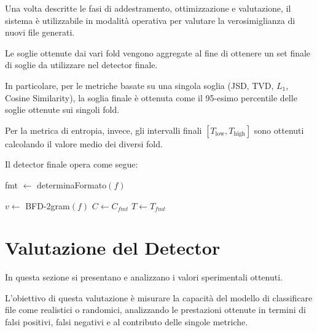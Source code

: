 \documentclass{report}
\begin{document}
Una volta descritte le fasi di addestramento, ottimizzazione e valutazione, il sistema è utilizzabile 
in modalità operativa per valutare la verosimiglianza di nuovi file generati.

Le soglie ottenute dai vari fold vengono aggregate al fine di ottenere un set finale di soglie da utilizzare nel detector finale.

In particolare, per le metriche basate su una singola soglia (JSD, TVD, $L_1$, Cosine Similarity),
la soglia finale è ottenuta come il 95-esimo percentile delle soglie ottenute sui singoli fold.

Per la metrica di entropia, invece, gli intervalli finali $[T_{\text{low}}, T_{\text{high}}]$ sono ottenuti
calcolando il valore medio dei diversi fold.

\bigskip

Il detector finale opera come segue:

\bigskip

\begin{algorithm}[H]
\caption{DetectorOperativo}


fmt $\gets$ determinaFormato$(f)$\;


$v \gets$ BFD-2gram$(f)$\;
$C \gets C_{fmt}$\;
$T \gets T_{fmt}$\;


\end{algorithm}






\section{Valutazione del Detector}

In questa sezione si  presentano e analizzano i valori sperimentali ottenuti.

L'obiettivo di questa valutazione è misurare la capacità del modello di classificare file come realistici o randomici,
analizzando le prestazioni ottenute in termini di falsi positivi, falsi negativi e al contributo delle singole metriche.
\end{document}
